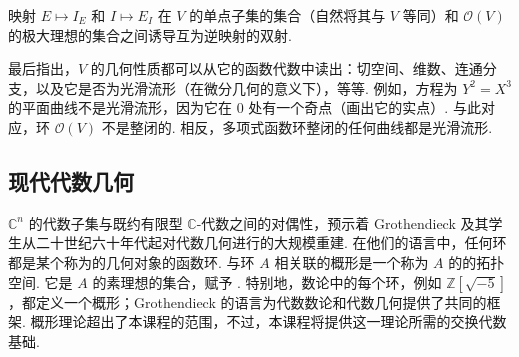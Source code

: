 \begin{theorem*}
映射 $E\longmapsto I_E$ 和 $I\longmapsto E_I$ 在 $V$ 的单点子集的集合（自然将其与 $V$ 等同）和 $\mathcal{O}(V)$ 的极大理想的集合之间诱导互为逆映射的双射.
\end{theorem*}

最后指出，$V$ 的几何性质都可以从它的函数代数中读出：切空间、维数、连通分支，以及它是否为光滑流形（在微分几何的意义下），等等. 例如，方程为 $Y^2=X^3$ 的平面曲线不是光滑流形，因为它在 $0$ 处有一个奇点（画出它的实点）. 与此对应，环 $\mathcal{O}(V)$ 不是整闭的. 相反，多项式函数环整闭的任何曲线都是光滑流形.

\subsection{现代代数几何}
\label{sec:galois-1-1-6}

$\mathbb{C}^{n}$ 的代数子集与既约有限型 $\mathbb{C}$-代数之间的对偶性，预示着 Grothendieck 及其学生从二十世纪六十年代起对代数几何进行的大规模重建. 在他们的语言中，任何环都是某个称为的几何对象的函数环. 与环 $A$ 相关联的概形是一个称为 $A$ 的的拓扑空间. 它是 $A$ 的素理想的集合，赋予 . 特别地，数论中的每个环，例如 $\mathbb{Z}[\sqrt{-5}]$，都定义一个概形；Grothendieck 的语言为代数数论和代数几何提供了共同的框架. 概形理论超出了本课程的范围，不过，本课程将提供这一理论所需的交换代数基础.
